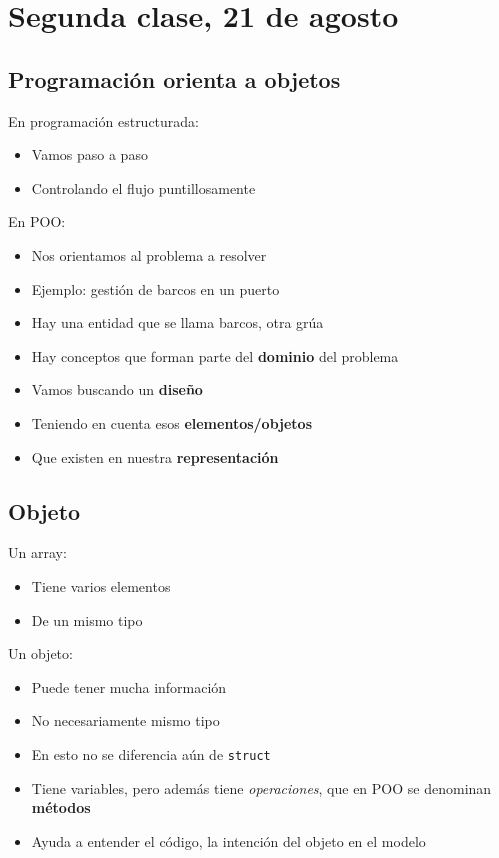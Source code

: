 \section{Segunda clase, 21 de agosto}

\subsection{Programación orienta a objetos}

En programación estructurada:
\begin{itemize}
    \item Vamos paso a paso
    \item Controlando el flujo puntillosamente
\end{itemize}

En POO:
\begin{itemize}
    \item Nos orientamos al problema a resolver
    \item Ejemplo: gestión de barcos en un puerto
    \item Hay una entidad que se llama barcos, otra grúa
    \item Hay conceptos que forman parte del \textbf{dominio} del problema
    \item Vamos buscando un \textbf{diseño}
    \item Teniendo en cuenta esos \textbf{elementos/objetos}
    \item Que existen en nuestra \textbf{representación}
\end{itemize}

\subsection{Objeto}

Un array:
\begin{itemize}
    \item Tiene varios elementos
    \item De un mismo tipo
\end{itemize}

Un objeto:
\begin{itemize}
    \item Puede tener mucha información
    \item No necesariamente mismo tipo
    \item En esto no se diferencia aún de \texttt{struct}
    \item Tiene variables, pero además tiene \textit{operaciones}, que en 
    POO se denominan \textbf{métodos}
    \item Ayuda a entender el código, la intención del objeto en el modelo
\end{itemize}

